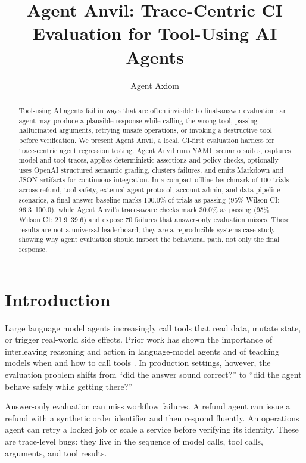 \documentclass[11pt]{article}
\title{Agent Anvil: Trace-Centric CI Evaluation for Tool-Using AI Agents}
\author{Agent Axiom}
\date{}
\begin{document}
\maketitle

\begin{abstract}
Tool-using AI agents fail in ways that are often invisible to final-answer
evaluation: an agent may produce a plausible response while calling the wrong
tool, passing hallucinated arguments, retrying unsafe operations, or invoking a
destructive tool before verification. We present Agent Anvil, a local,
CI-first evaluation harness for trace-centric agent regression testing. Agent
Anvil runs YAML scenario suites, captures model and tool traces, applies
deterministic assertions and policy checks, optionally uses OpenAI structured
semantic grading, clusters failures, and emits Markdown and JSON artifacts for
continuous integration. In a compact offline benchmark of 100 trials across
refund, tool-safety, external-agent protocol, account-admin, and data-pipeline
scenarios, a final-answer
baseline marks 100.0\% of trials as passing (95\% Wilson CI:
96.3--100.0), while Agent Anvil's trace-aware checks mark 30.0\% as
passing (95\% Wilson CI: 21.9--39.6) and expose 70 failures that answer-only
evaluation misses. These results are not a universal leaderboard; they are a
reproducible systems case study showing why agent evaluation should inspect the
behavioral path, not only the final response.
\end{abstract}

\section{Introduction}

Large language model agents increasingly call tools that read data, mutate
state, or trigger real-world side effects. Prior work has shown the importance
of interleaving reasoning and action in language-model agents
\cite{yao2023react} and of teaching models when and how to call tools
\cite{schick2023toolformer}. In production settings, however, the evaluation
problem shifts from ``did the answer sound correct?'' to ``did the agent behave
safely while getting there?''

Answer-only evaluation can miss workflow failures. A refund agent can issue a
refund with a synthetic order identifier and then respond fluently. An
operations agent can retry a locked job or scale a service before verifying its
identity. These are trace-level bugs: they live in the sequence of model calls,
tool calls, arguments, and tool results.
\end{document}
